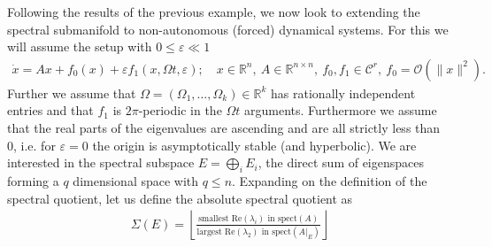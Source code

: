 Following the results of the previous example, we now look to extending the spectral submanifold to non-autonomous (forced) dynamical systems. For this we will assume the setup with $0\leq \varepsilon \ll 1$
\begin{align}
	\dot{x} = Ax + f_0(x) + \varepsilon f_1(x, \Omega t, \varepsilon);\quad x \in \mathbb{R}^{n},\ A \in \mathbb{R}^{n\times n},\ f_0,f_1 \in \mathcal{C}^{r},\ f_0 = \mathcal{O}(\|x\|^2).
\end{align}
Further we assume that $\Omega = (\Omega_1,\ldots,\Omega_k)\in \mathbb{R}^{k}$ has rationally independent entries and that $f_1$ is $2\pi$-periodic in the $\Omega t$ arguments. Furthermore we assume that the real parts of the eigenvalues are ascending and are all strictly less than 0, i.e. for $\varepsilon = 0$ the origin is asymptotically stable (and hyperbolic). We are interested in the spectral subspace $E= \bigoplus_{i}E_{i}$, the direct sum of eigenspaces forming a $q$ dimensional space with $q\leq n$. Expanding on the definition of the spectral quotient, let us define the absolute spectral quotient as 
\begin{align}
	\Sigma(E) = \left\lfloor \frac{ \textrm{smallest Re}(\lambda_i)  \textrm{ in spect} (A) }{ \textrm{largest Re} (\lambda _2)\textrm{ in spect} (A|_{E})} \right\rfloor
\end{align}

